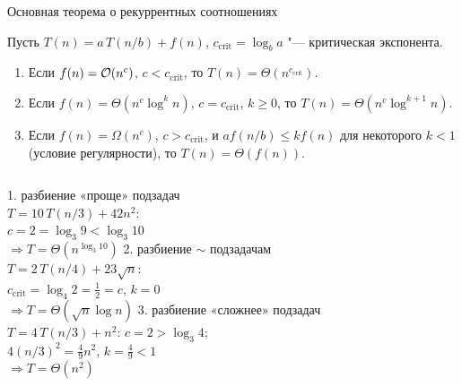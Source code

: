 \documentclass{ca-slides}
\begin{document}
\begin{canvasframe}[shrink=14]{Основная теорема о рекуррентных соотношениях}
  \footnotesize
  \begin{theorem}
    Пусть $T(n) = a\,T(n/b) + f(n)$, $c_{\mathrm{crit}} = \log_b a$ "--- критическая экспонента.
    \begin{enumerate}
      \item Если $f(n) = \mathcal{O}(n^c)$, $c < c_{\mathrm{crit}}$, то $T(n) = \Theta(n^{c_{\mathrm{crit}}})$.
      \item Если $f(n) = \Theta(n^{c} \log^k n)$, $c = c_{\mathrm{crit}}$, $k \ge 0$, то
        $T(n) = \Theta(n^{c} \log^{k+1} n)$.
      \item Если $f(n) = \Omega(n^c)$, $c > c_{\mathrm{crit}}$, и $a f(n/b) \le k f(n)$ для
        некоторого $k < 1$ (условие регулярности), то $T(n) = \Theta(f(n))$.
    \end{enumerate}
  \end{theorem}
  \begin{columns}[T]
      \textcolor{caRed}{1. разбиение «проще» подзадач}\\
      $T = 10\,T(n/3) + 42 n^2$:\\ $c = 2 = \log_3 9 < \log_3 10$\\
      $\Rightarrow T = \Theta(n^{\log_3 10})$
      \textcolor{caRed}{2. разбиение $\sim$ подзадачам}\\
      $T = 2\,T(n/4) + 23\sqrt n$:\\ $c_{\mathrm{crit}} = \log_4 2 = \frac12 = c$, $k = 0$\\
      $\Rightarrow T = \Theta(\sqrt n \log n)$
      \textcolor{caRed}{3. разбиение «сложнее» подзадач}\\
      $T = 4\,T(n/3) + n^2$: $c = 2 > \log_3 4$;\\
      $4 (n/3)^2 = \frac49 n^2$, $k = \frac49 < 1$\\
      $\Rightarrow T = \Theta(n^2)$
  \end{columns}
\end{canvasframe}
\end{document}
